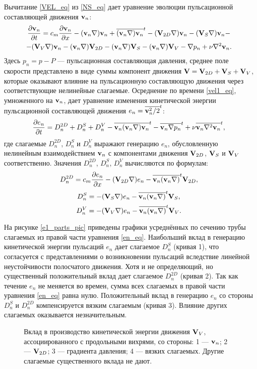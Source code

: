 Вычитание \eqref{VEL_eq} из \eqref{NS_eq} дает уравнение эволюции пульсационной составляющей движения $\mathbf{v}_n$: 
\begin{multline} \label{vel1_eq}
\frac{\partial \mathbf{v}_n}{\partial t} = c_m \frac{\partial \mathbf{v}_n}{\partial x} - (\mathbf{v}_n \nabla) \mathbf{v}_n + \overline{(\mathbf{v}_n \nabla) \mathbf{v}_n}^t - (\mathbf{V}_{2D} \nabla) \mathbf{v}_n - (\mathbf{V}_S \nabla) \mathbf{v}_n - \\ - (\mathbf{V}_V \nabla) \mathbf{v}_n - (\mathbf{v}_n \nabla) \mathbf{V}_{2D} - (\mathbf{v}_n \nabla) \mathbf{V}_S - (\mathbf{v}_n \nabla) \mathbf{V}_V - \nabla p_n + \nu \nabla^2 \mathbf{v}_n. 
\end{multline}
Здесь $p_n = p - P$ --- пульсационная составляющая давления, среднее поле скорости представлено в виде суммы компонент движения $\mathbf{V} = \mathbf{V}_{2D} + \mathbf{V}_S + \mathbf{V}_V$, которые оказывают влияние на пульсационную составляющую движения через соответствующие нелинейные слагаемые. Осреднение по времени \eqref{vel1_eq}, умноженного на $\mathbf{v}_n$, дает уравнение изменения кинетической энергии пульсационной составляющей движения $e_n = \overline{\mathbf{v}_n^2/2}^t$: 
\begin{equation}\label{en_eq}
\frac{\partial e_n}{\partial t} = D_n^{2D} + D_n^{S} + D_n^{V} - \overline{\mathbf{v}_n (\mathbf{v}_n \nabla) \mathbf{v}_n}^t - \overline{\mathbf{v}_n \nabla p_n}^t + \nu \overline{\mathbf{v}_n \nabla^2 \mathbf{v}_n}^t,
\end{equation}
где слагаемые $D_n^{2D}$, $D_n^{S}$ и $D_n^{V}$ выражают генерацию $e_n$, обусловленную нелинейным взаимодействием $\mathbf{v}_n$ с компонентами движения $\mathbf{V}_{2D}$, $\mathbf{V}_S$ и $\mathbf{V}_V$ соответственно. Значения $D_n^{2D}$, $D_n^{S}$, $D_n^{V}$ вычисляются по формулам:
$$
D_n^{2D} = c_m \frac{\partial e_n}{\partial x}  - (\mathbf{V}_{2D} \nabla) e_n - \overline{\mathbf{v}_n (\mathbf{v}_n \nabla) }^t \mathbf{V}_{2D},
$$
$$
D_n^{S}  = - (\mathbf{V}_S \nabla) e_n - \overline{\mathbf{v}_n (\mathbf{v}_n \nabla)}^t \mathbf{V}_S,
$$
$$
D_n^{V} =  - (\mathbf{V}_V \nabla) e_n - \overline{\mathbf{v}_n (\mathbf{v}_n \nabla)}^t \mathbf{V}_V.
$$

На рисунке \ref{e1_parts_pic} приведены графики усреднённых по сечению трубы слагаемых из правой части уравнения \eqref{en_eq}. Наибольший вклад в генерацию кинетической энергии пульсаций $e_n$ дает слагаемое $D_n^S$ (кривая 1), что согласуется с представлениями о возникновении пульсаций вследствие линейной неустойчивости полосчатого движения. Хотя и не определяющий, но существенный положительный вклад дает слагаемое $D_n^{2D}$ (кривая 2). Так как течение $e_n$ не меняется во времен, сумма всех слагаемых в правой части уравнения \eqref{en_eq} равна нулю. Положительный вклад в генерацию $e_n$ со стороны $D_n^S$ и $D_n^{2D}$ компенсируется вязким слагаемым (кривая 3). Влияние других слагаемых оказывается незначительным. 

\begin{figure}
\caption{Вклад в производство кинетической энергии движения $\mathbf{V}_V$, ассоциированного с продольными вихрями, со стороны: 1 --- $\mathbf{v}_n$; 2 --- $\mathbf{V}_{2D}$; 3 --- градиента давления; 4 --- вязких слагаемых. Другие слагаемые существенного вклада не дают.}
\label{ev_parts_pic}
\end{figure}

